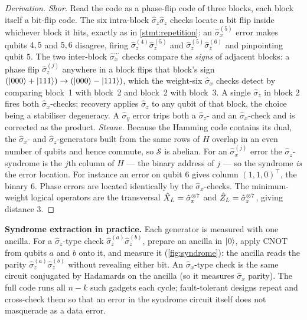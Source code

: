 \begin{proof}[Derivation]
\emph{Shor.} Read the code as a phase-flip code of three blocks, each
block itself a bit-flip code. The six intra-block
$\hat\sigma_z\hat\sigma_z$ checks locate a bit flip inside whichever
block it hits, exactly as in \cref{stmt:repetition}: an
$\hat\sigma_x^{(5)}$ error makes qubits $4,5$ and $5,6$ disagree, firing
$\hat\sigma_z^{(4)}\hat\sigma_z^{(5)}$ and
$\hat\sigma_z^{(5)}\hat\sigma_z^{(6)}$ and pinpointing qubit $5$. The two
inter-block $\hat\sigma_x^{\cdots}$ checks compare the \emph{signs} of
adjacent blocks: a phase flip $\hat\sigma_z^{(j)}$ anywhere in a block
flips that block's sign $(\ket{000}+\ket{111})\to(\ket{000}-\ket{111})$,
which the weight-six $\hat\sigma_x$ checks detect by comparing block~1
with block~2 and block~2 with block~3. A single $\hat\sigma_z$ in block
$2$ fires both $\hat\sigma_x$-checks; recovery applies $\hat\sigma_z$ to
any qubit of that block, the choice being a stabiliser degeneracy. A
$\hat\sigma_y$ error trips both a $\hat\sigma_z$- and an
$\hat\sigma_x$-check and is corrected as the product. \emph{Steane.}
Because the Hamming code contains its dual, the $\hat\sigma_x$- and
$\hat\sigma_z$-generators built from the same rows of $H$ overlap in an
even number of qubits and hence commute, so $\mathcal S$ is abelian. For
an $\hat\sigma_x^{(j)}$ error the $\hat\sigma_z$-syndrome is the $j$th
column of $H$ --- the binary address of $j$ --- so the syndrome
\emph{is} the error location. For instance an error on qubit $6$ gives
column $(1,1,0)^{\!\top}$, the binary $6$. Phase errors are located
identically by the $\hat\sigma_x$-checks. The minimum-weight logical
operators are the transversal
$\hat{X}_L=\hat\sigma_x^{\otimes7}$ and
$\hat{Z}_L=\hat\sigma_z^{\otimes7}$, giving distance $3$.
\end{proof}

\begin{remark}
\textbf{Syndrome extraction in practice.} Each generator is measured
with one ancilla. For a $\hat\sigma_z$-type check
$\hat\sigma_z^{(a)}\hat\sigma_z^{(b)}$, prepare an ancilla in $\ket{0}$,
apply $\mathrm{CNOT}$ from qubits $a$ and $b$ onto it, and measure it
(\cref{fig:syndrome}):
the ancilla reads the parity $\hat\sigma_z^{(a)}\hat\sigma_z^{(b)}$
without revealing either bit. An $\hat\sigma_x$-type check is the same
circuit conjugated by Hadamards on the ancilla (so it measures
$\hat\sigma_x$ parity). The full code runs all $n-k$ such gadgets each
cycle; fault-tolerant designs repeat and cross-check them so that an
error in the syndrome circuit itself does not masquerade as a data
error.
\end{remark}

